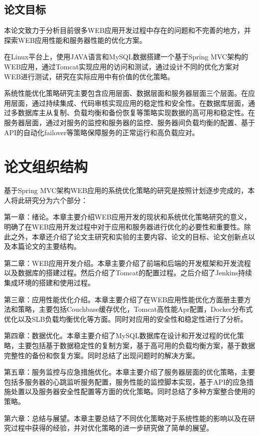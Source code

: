 \subsection{论文目标}
本论文致力于分析目前很多WEB应用开发过程中存在的问题和不完善的地方，并探索WEB应用性能和服务器性能的优化方案。

在Linux平台上，使用JAVA语言和MySQL数据搭建一个基于Spring MVC架构的WEB应用，通过Tomcat实现应用的访问和测试，通过设计不同的优化方案对WEB进行测试，研究在实际应用中有价值的优化策略。

系统性能优化策略研究主要包含应用层面、数据层面和服务器层面三个层面。在应用层面，通过持续集成、代码审核实现应用的稳定性和安全性。在数据库层面，通过多数据库主从复制、负载均衡和备份恢复等策略实现数据的高可用和稳定性。在服务器层面，通过对服务的监控和服务器的监控、服务器间负载均衡的配置、基于API的自动化failover等策略保障服务的正常运行和高负载应对。
\section{论文组织结构}
基于Spring MVC架构WEB应用的系统优化策略的研究是按照计划逐步完成的，本人将此研究分为六个部分：

第一章：绪论。本章主要介绍WEB应用开发的现状和系统优化策略研究的意义，明确了在WEB应用开发过程中对于应用和服务器进行优化的必要性和重要性。除此之外，本章还介绍了论文主研究和实验的主要内容、论文的目标、论文创新点以及本篇论文的主要结构。

第二章：WEB应用开发介绍。本章主要介绍了前端和后端的开发框架和开发流程以及数据库的搭建过程。然后介绍了Tomcat的配置过程。之后介绍了Jenkins持续集成环境的搭建和使用过程。

第三章：应用性能优化介绍。本章主要介绍了在WEB应用性能优化方面册主要方法和策略，主要包括Couchbase缓存优化，Tomcat高性能Apr配置，Docker分布式优化以及SLB负载均衡优化等方面。同时对应用的安全性和稳定性进行了分析。

第四章：数据优化。本章主要介绍了MySQL数据库在设计和开发过程的优化策略，主要包括基于数据稳定性的复制方案，基于高可用的负载均衡方案，基于数据完整性的备份和恢复方案。同时总结了出现问题时的解决方案。

第五章：服务监控与应急措施优化。本章主要介绍了服务器层面的优化策略，主要包括多服务器的心跳监听服务配置，服务性能的监控脚本实现，基于API的应急措施处置以及服务器安全性配置等方面的优化策略。同时总结了多种方案整合使用的策略。

第六章：总结与展望。本章主要总结了不同优化策略对于系统性能的影响以及在研究过程中获得的经验，并对优化策略的进一步研究做了简单的展望。